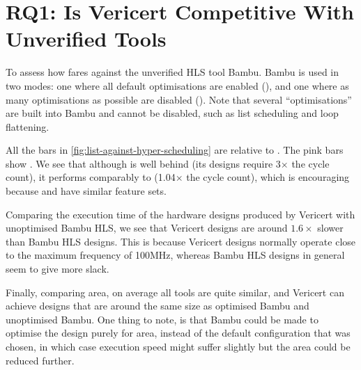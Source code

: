 
\section{RQ1: Is Vericert Competitive With Unverified Tools}

To assess how \VericertHyper{} fares against the unverified HLS tool Bambu.
Bambu is used in two modes: one where all default optimisations are enabled
(\BambuDefault{}), and one where as many optimisations as possible are disabled
(\BambuNoOpt{}). Note that several \enquote{optimisations} are built into Bambu
and cannot be disabled, such as list scheduling and loop flattening.

All the bars in \cref{fig:list-against-hyper-scheduling} are relative to
\BambuDefault. The pink bars show \BambuNoOpt. We see that although
\VericertHyper{} is well behind \BambuDefault{} (its designs require 3$\times$
the cycle count), it performs comparably to \BambuNoOpt{} (1.04$\times$ the
cycle count), which is encouraging because \VericertHyper{} and \BambuNoOpt{}
have similar feature sets.

Comparing the execution time of the hardware designs produced by Vericert with
unoptimised Bambu HLS, we see that Vericert designs are around $1.6\times$
slower than Bambu HLS designs.  This is because Vericert designs normally
operate close to the maximum frequency of 100MHz, whereas Bambu HLS designs in
general seem to give more slack.

Finally, comparing area, on average all tools are quite similar, and Vericert
can achieve designs that are around the same size as optimised Bambu and
unoptimised Bambu.  One thing to note, is that Bambu could be made to optimise
the design purely for area, instead of the default configuration that was
chosen, in which case execution speed might suffer slightly but the area could
be reduced further.

